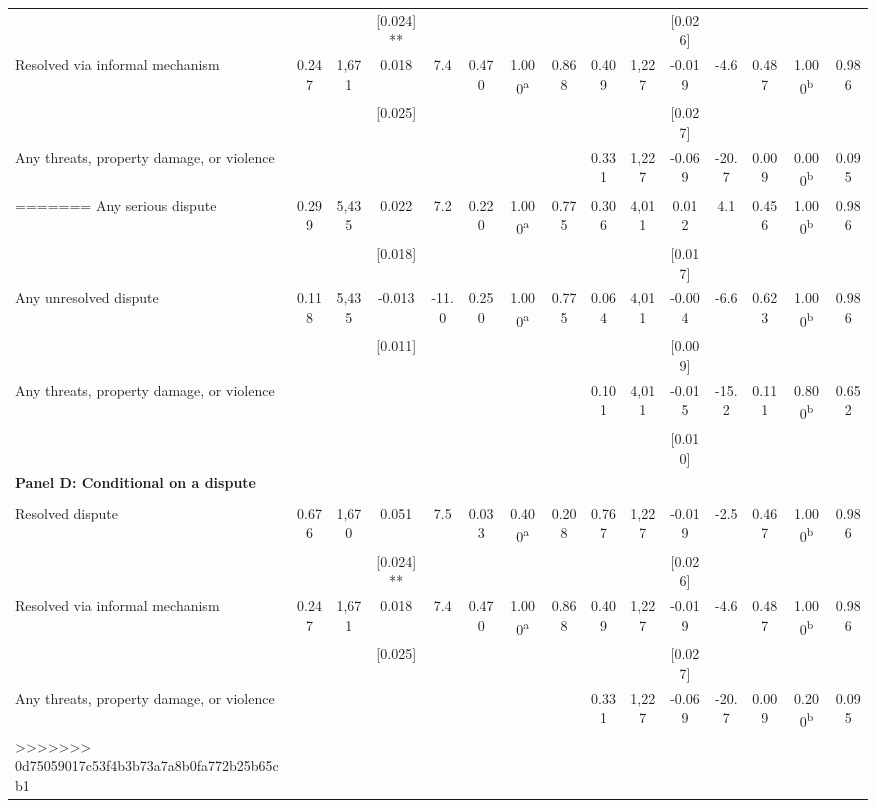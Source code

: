 \begin{tabular}{lcccccccccccccc}
 &  &  & [0.024]** &  &  &  &  &  &  & [0.026] &  &  &  & \\
\quad Resolved via informal mechanism & 0.247 & 1,671 & 0.018 & 7.4 & 0.470 & 1.000\textsuperscript{a} & 0.868 & 0.409 & 1,227 & -0.019 & -4.6 & 0.487 & 1.000\textsuperscript{b} & 0.986\\
 &  &  & [0.025] &  &  &  &  &  &  & [0.027] &  &  &  & \\
\phantom{} Any threats, property damage, or violence \phantom{} &  &  &  &  &  &  &  & 0.331 & 1,227 & -0.069 & -20.7 & 0.009 & 0.000\textsuperscript{b} & 0.095\\
=======
Any serious dispute & 0.299 & 5,435 & 0.022 & 7.2 & 0.220 & 1.000\textsuperscript{a} & 0.775 & 0.306 & 4,011 & 0.012 & 4.1 & 0.456 & 1.000\textsuperscript{b} & 0.986\\
 &  &  & [0.018] &  &  &  &  &  &  & [0.017] &  &  &  & \\
Any unresolved dispute & 0.118 & 5,435 & -0.013 & -11.0 & 0.250 & 1.000\textsuperscript{a} & 0.775 & 0.064 & 4,011 & -0.004 & -6.6 & 0.623 & 1.000\textsuperscript{b} & 0.986\\
 &  &  & [0.011] &  &  &  &  &  &  & [0.009] &  &  &  & \\
\phantom{} Any threats, property damage, or violence &  &  &  &  &  &  &  & 0.101 & 4,011 & -0.015 & -15.2 & 0.111 & 0.800\textsuperscript{b} & 0.652\\
 &  &  &  &  &  &  &  &  &  & [0.010] &  &  &  & \\
\textbf{Panel D: Conditional on a dispute} &  &  &  &  &  &  &  &  &  &  &  &  &  & \\
 &  &  &  &  &  &  &  &  &  &  &  &  &  & \\
Resolved dispute & 0.676 & 1,670 & 0.051 & 7.5 & 0.033 & 0.400\textsuperscript{a} & 0.208 & 0.767 & 1,227 & -0.019 & -2.5 & 0.467 & 1.000\textsuperscript{b} & 0.986\\
 &  &  & [0.024]** &  &  &  &  &  &  & [0.026] &  &  &  & \\
\quad Resolved via informal mechanism & 0.247 & 1,671 & 0.018 & 7.4 & 0.470 & 1.000\textsuperscript{a} & 0.868 & 0.409 & 1,227 & -0.019 & -4.6 & 0.487 & 1.000\textsuperscript{b} & 0.986\\
 &  &  & [0.025] &  &  &  &  &  &  & [0.027] &  &  &  & \\
\phantom{} Any threats, property damage, or violence \phantom{} &  &  &  &  &  &  &  & 0.331 & 1,227 & -0.069 & -20.7 & 0.009 & 0.200\textsuperscript{b} & 0.095\\
>>>>>>> 0d75059017c53f4b3b73a7a8b0fa772b25b65cb1

\end{tabular}
